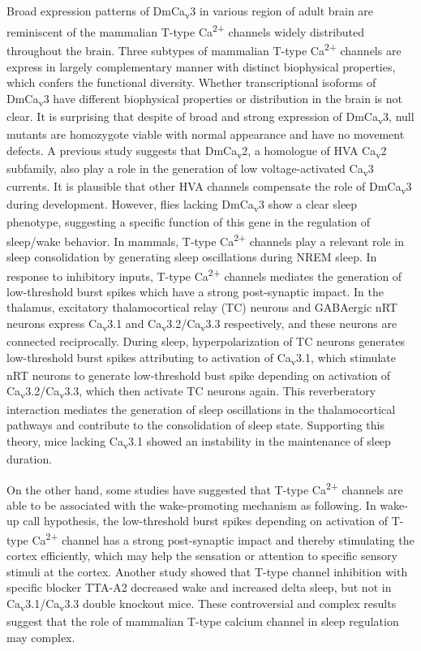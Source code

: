 Broad expression patterns of DmCa\textsubscript{v}3 in various region of adult brain are reminiscent of the mammalian T-type Ca\textsuperscript{2+} channels widely distributed throughout the brain\cite{talley:1999aa}. 
Three subtypes of mammalian T-type Ca\textsuperscript{2+} channels are express in largely complementary manner with distinct biophysical properties, which confers the functional diversity. 
Whether transcriptional isoforms of DmCa\textsubscript{v}3 have different biophysical properties or distribution in the brain is not clear.    
It is surprising that despite of broad and strong expression of DmCa\textsubscript{v}3, null mutants are homozygote viable with normal appearance and have no movement defects.
A previous study suggests that DmCa\textsubscript{v}2, a homologue of HVA Ca\textsubscript{v}2 subfamily, also play a role in the generation of low voltage-activated Ca\textsubscript{v}3 currents\cite{Ryglewski:2012jk}.
It is plausible that other HVA channels compensate the role of DmCa\textsubscript{v}3 during development.
However, flies lacking DmCa\textsubscript{v}3 show a clear sleep phenotype, suggesting a specific function of this gene in the regulation of sleep/wake behavior.
In mammals, T-type Ca\textsuperscript{2+} channels play a relevant role in sleep consolidation by generating sleep oscillations during NREM sleep.
In response to inhibitory inputs, T-type Ca\textsuperscript{2+} channels mediates the generation of low-threshold burst spikes which have a strong post-synaptic impact.
In the thalamus, excitatory thalamocortical relay (TC) neurons and GABAergic nRT neurons express Ca\textsubscript{v}3.1 and Ca\textsubscript{v}3.2/Ca\textsubscript{v}3.3 respectively, and these neurons are connected reciprocally.
During sleep, hyperpolarization of TC neurons generates low-threshold burst spikes attributing to activation of Ca\textsubscript{v}3.1, which stimulate nRT neurons to generate low-threshold bust spike depending on activation of Ca\textsubscript{v}3.2/Ca\textsubscript{v}3.3, which then activate TC neurons again.
This reverberatory interaction mediates the generation of sleep oscillations in the thalamocortical pathways and contribute to the consolidation of sleep state.
Supporting this theory, mice lacking Ca\textsubscript{v}3.1 showed an instability in the maintenance of sleep duration\cite{Lee:2004ey}.

On the other hand, some studies have suggested that T-type Ca\textsuperscript{2+} channels are able to be associated with the wake-promoting mechanism as following.
In wake-up call hypothesis, the low-threshold burst spikes depending on activation of T-type Ca\textsuperscript{2+} channel has a strong post-synaptic impact and thereby stimulating the cortex efficiently\cite{swadlow:2001aa}, which may help the sensation or attention to specific sensory stimuli at the cortex.
Another study showed that T-type channel inhibition with specific blocker TTA-A2 decreased wake and increased delta sleep, but not in Ca\textsubscript{v}3.1/Ca\textsubscript{v}3.3 double knockout mice\cite{kraus:2010aa}. These controversial and complex results suggest that the role of mammalian T-type calcium channel in sleep regulation may complex. 

